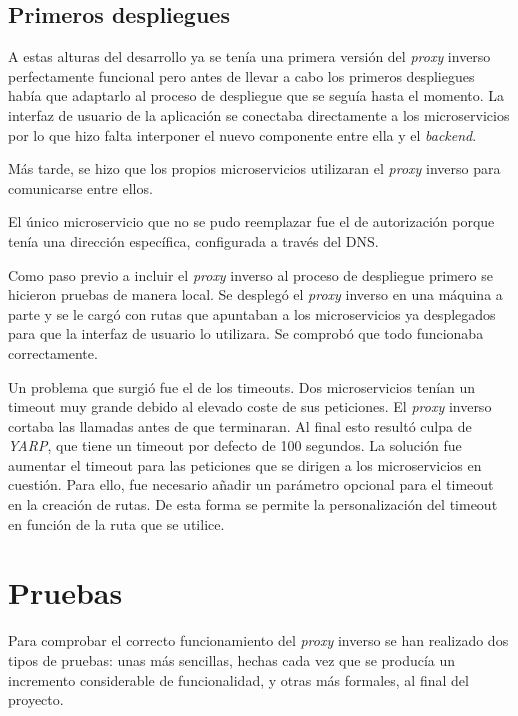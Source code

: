 \documentclass[11pt,spanish,listoffigures]{tfgetsinf}
\begin{document}

		\subsection{Primeros despliegues}

A estas alturas del desarrollo ya se tenía una primera versión del \emph{proxy} inverso perfectamente funcional pero antes de llevar a cabo los primeros despliegues había que adaptarlo al proceso de despliegue que se seguía hasta el momento. La interfaz de usuario de la aplicación se conectaba directamente a los microservicios por lo que hizo falta interponer el nuevo componente entre ella y el \emph{backend}.

Más tarde, se hizo que los propios microservicios utilizaran el \emph{proxy} inverso para comunicarse entre ellos.

El único microservicio que no se pudo reemplazar fue el de autorización porque tenía una dirección específica, configurada a través del DNS.

Como paso previo a incluir el \emph{proxy} inverso al proceso de despliegue primero se hicieron pruebas de manera local. Se desplegó el \emph{proxy} inverso en una máquina a parte y se le cargó con rutas que apuntaban a los microservicios ya desplegados para que la interfaz de usuario lo utilizara. Se comprobó que todo funcionaba correctamente.

Un problema que surgió fue el de los timeouts. Dos microservicios tenían un timeout muy grande debido al elevado coste de sus peticiones. El \emph{proxy} inverso cortaba las llamadas antes de que terminaran. Al final esto resultó culpa de \emph{YARP}, que tiene un timeout por defecto de 100 segundos. La solución fue aumentar el timeout para las peticiones que se dirigen a los microservicios en cuestión. Para ello, fue necesario añadir un parámetro opcional para el timeout en la creación de rutas. De esta forma se permite la personalización del timeout en función de la ruta que se utilice.


	\section{Pruebas}

Para comprobar el correcto funcionamiento del \emph{proxy} inverso se han realizado dos tipos de pruebas: unas más sencillas, hechas cada vez que se producía un incremento considerable de funcionalidad, y otras más formales, al final del proyecto.
\end{document}
